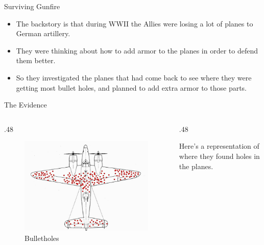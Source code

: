 \documentclass[
  ignorenonframetext,
]{beamer}
\providecommand{\tightlist}{%
  \setlength{\itemsep}{0pt}\setlength{\parskip}{0pt}}
\renewcommand{\,}{\text{, }}
\def\begincols{\begin{columns}}
\def\begincol{\begin{column}}
\def\endcol{\end{column}}
\def\endcols{\end{columns}}
\begin{document}
\begin{frame}{Surviving Gunfire}
\protect\hypertarget{surviving-gunfire}{}

\begin{itemize}
\tightlist
\item
  The backstory is that during WWII the Allies were losing a lot of
  planes to German artillery.
\item
  They were thinking about how to add armor to the planes in order to
  defend them better.
\item
  So they investigated the planes that had come back to see where they
  were getting most bullet holes, and planned to add extra armor to
  those parts.
\end{itemize}

\end{frame}

\begin{frame}{The Evidence}
\protect\hypertarget{the-evidence}{}

\begincols
\begincol{.48\textwidth}

\begin{figure}
\centering
\includegraphics{../images/class10/wald_plane.jpg}
\caption{Bulletholes}
\end{figure}

\endcol
\begincol{.48\textwidth}

Here's a representation of where they found holes in the planes.

\endcol
\endcols

\end{frame}
\end{document}
